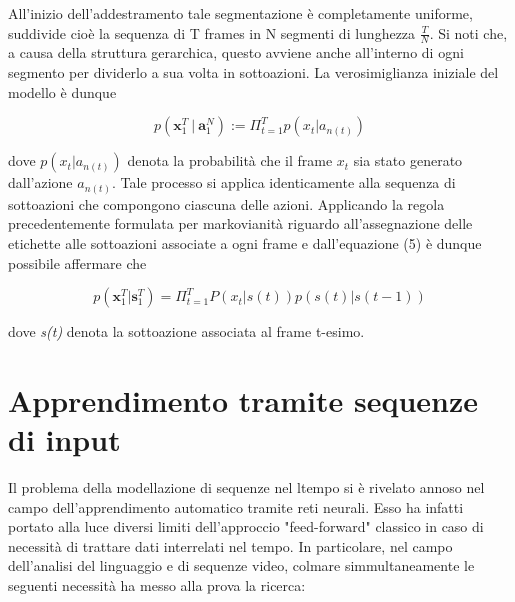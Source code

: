 \documentclass[10pt,letterpaper]{article}
\begin{document}
All'inizio dell'addestramento tale segmentazione è completamente uniforme, suddivide cioè la sequenza di T frames in N segmenti di lunghezza $\frac{T}{N}$. Si noti che, a causa della struttura gerarchica, questo avviene anche all'interno di ogni segmento per dividerlo a sua volta in sottoazioni. La verosimiglianza iniziale del modello è dunque

\begin{equation}
p(\textbf{x}_1^T\:|\:\textbf{a}_1^N) := \Pi_{t=1}^T p(x_t|a_{n(t)})
\end{equation}

dove $p(x_t|a_{n(t)})$ denota la probabilità che il frame $x_t$ sia stato generato dall'azione $a_{n(t)}$. Tale processo si applica identicamente alla sequenza di sottoazioni che compongono ciascuna delle azioni. Applicando la regola precedentemente formulata per markovianità riguardo all'assegnazione delle etichette alle sottoazioni associate a ogni frame e dall'equazione (5) è dunque possibile affermare che

\begin{equation}
p(\textbf{x}_1^T|\textbf{s}_1^T) = \Pi_{t=1}^T P(x_t|s(t))p(s(t)|s(t-1))
\end{equation}

dove \textit{s(t)} denota la sottoazione associata al frame t-esimo.

\section{Apprendimento tramite sequenze di input}
Il problema della modellazione di sequenze nel ltempo si è rivelato annoso nel campo dell'apprendimento automatico tramite reti neurali. Esso ha infatti portato alla luce diversi limiti dell'approccio "feed-forward" classico in caso di necessità di trattare dati interrelati nel tempo. In particolare, nel campo dell'analisi del linguaggio e di sequenze video, colmare simmultaneamente le seguenti necessità ha messo alla prova la ricerca:
\end{document}
